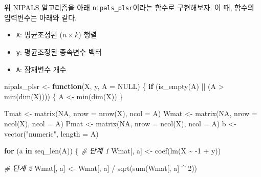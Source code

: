 \documentclass[
]{book}
\newenvironment{Shaded}{\begin{snugshade}}{\end{snugshade}}
\newcommand{\AttributeTok}[1]{\textcolor[rgb]{0.77,0.63,0.00}{#1}}
\newcommand{\CommentTok}[1]{\textcolor[rgb]{0.56,0.35,0.01}{\textit{#1}}}
\newcommand{\ConstantTok}[1]{\textcolor[rgb]{0.00,0.00,0.00}{#1}}
\newcommand{\ControlFlowTok}[1]{\textcolor[rgb]{0.13,0.29,0.53}{\textbf{#1}}}
\newcommand{\DecValTok}[1]{\textcolor[rgb]{0.00,0.00,0.81}{#1}}
\newcommand{\FunctionTok}[1]{\textcolor[rgb]{0.00,0.00,0.00}{#1}}
\newcommand{\NormalTok}[1]{#1}
\newcommand{\OtherTok}[1]{\textcolor[rgb]{0.56,0.35,0.01}{#1}}
\newcommand{\SpecialCharTok}[1]{\textcolor[rgb]{0.00,0.00,0.00}{#1}}
\newcommand{\StringTok}[1]{\textcolor[rgb]{0.31,0.60,0.02}{#1}}
\providecommand{\tightlist}{%
  \setlength{\itemsep}{0pt}\setlength{\parskip}{0pt}}
\begin{document}
위 NIPALS 알고리즘을 아래 \texttt{nipals\_plsr}이라는 함수로 구현해보자. 이 때, 함수의 입력변수는 아래와 같다.

\begin{itemize}
\tightlist
\item
  \texttt{X}: 평균조정된 (\(n \times k\)) 행렬
\item
  \texttt{y}: 평균조정된 종속변수 벡터
\item
  \texttt{A}: 잠재변수 개수
\end{itemize}

\begin{Shaded}
\begin{Highlighting}[]
\NormalTok{nipals\_plsr }\OtherTok{\textless{}{-}} \ControlFlowTok{function}\NormalTok{(X, y, }\AttributeTok{A =} \ConstantTok{NULL}\NormalTok{) \{}
  \ControlFlowTok{if}\NormalTok{ (}\FunctionTok{is\_empty}\NormalTok{(A) }\SpecialCharTok{||}\NormalTok{ (A }\SpecialCharTok{\textgreater{}} \FunctionTok{min}\NormalTok{(}\FunctionTok{dim}\NormalTok{(X)))) \{}
\NormalTok{    A }\OtherTok{\textless{}{-}} \FunctionTok{min}\NormalTok{(}\FunctionTok{dim}\NormalTok{(X))}
\NormalTok{  \}}
  
\NormalTok{  Tmat }\OtherTok{\textless{}{-}} \FunctionTok{matrix}\NormalTok{(}\ConstantTok{NA}\NormalTok{, }\AttributeTok{nrow =} \FunctionTok{nrow}\NormalTok{(X), }\AttributeTok{ncol =}\NormalTok{ A)}
\NormalTok{  Wmat }\OtherTok{\textless{}{-}} \FunctionTok{matrix}\NormalTok{(}\ConstantTok{NA}\NormalTok{, }\AttributeTok{nrow =} \FunctionTok{ncol}\NormalTok{(X), }\AttributeTok{ncol =}\NormalTok{ A)}
\NormalTok{  Pmat }\OtherTok{\textless{}{-}} \FunctionTok{matrix}\NormalTok{(}\ConstantTok{NA}\NormalTok{, }\AttributeTok{nrow =} \FunctionTok{ncol}\NormalTok{(X), }\AttributeTok{ncol =}\NormalTok{ A)}
\NormalTok{  b }\OtherTok{\textless{}{-}} \FunctionTok{vector}\NormalTok{(}\StringTok{"numeric"}\NormalTok{, }\AttributeTok{length =}\NormalTok{ A)}
  
  \ControlFlowTok{for}\NormalTok{ (a }\ControlFlowTok{in} \FunctionTok{seq\_len}\NormalTok{(A)) \{}
    \CommentTok{\# 단계 1}
\NormalTok{    Wmat[, a] }\OtherTok{\textless{}{-}} \FunctionTok{coef}\NormalTok{(}\FunctionTok{lm}\NormalTok{(X }\SpecialCharTok{\textasciitilde{}} \SpecialCharTok{{-}}\DecValTok{1} \SpecialCharTok{+}\NormalTok{ y))}
    
    \CommentTok{\# 단계 2}
\NormalTok{    Wmat[, a] }\OtherTok{\textless{}{-}}\NormalTok{ Wmat[, a] }\SpecialCharTok{/} \FunctionTok{sqrt}\NormalTok{(}\FunctionTok{sum}\NormalTok{(Wmat[, a] }\SpecialCharTok{\^{}} \DecValTok{2}\NormalTok{))}


\end{Highlighting}
\end{Shaded}
\end{document}
